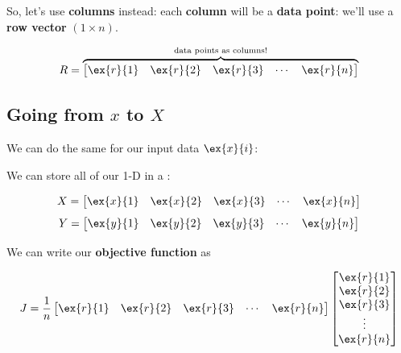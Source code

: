         So, let's use \textbf{columns} instead: each \textbf{column} will be a \textbf{data point}: we'll use a \textbf{row vector} $(1 \times n)$. 
        
        \begin{equation}
            R =
            \overbrace{
            \begin{bmatrix}
              \ex{r}{1} & \ex{r}{2} & \ex{r}{3} & \cdots & \ex{r}{n} 
            \end{bmatrix}
            }^{\text{data points as columns!}}
        \end{equation}
        
    \subsection{Going from $x$ to $X$}
    
        We can do the same for our input data $\ex{x}{i}$:\\
        
        \begin{notation}
            We can store all of our 1-D  in a :
            
            \begin{equation*}
                X =
                \begin{bmatrix}
                  \ex{x}{1} & \ex{x}{2} & \ex{x}{3} & \cdots & \ex{x}{n}
                \end{bmatrix}
            \end{equation*}
            \begin{equation*}
                Y =
                \begin{bmatrix}
                  \ex{y}{1} & \ex{y}{2} & \ex{y}{3} & \cdots & \ex{y}{n}
                \end{bmatrix}
            \end{equation*}
        \end{notation}
        
        We can write our \textbf{objective function} as
        
        \begin{equation}
            J = 
            \frac{1}{n}
            \begin{bmatrix}
              \ex{r}{1} & \ex{r}{2} & \ex{r}{3} & \cdots & \ex{r}{n}
            \end{bmatrix}
            \begin{bmatrix}
              \ex{r}{1} \\ \ex{r}{2} \\ \ex{r}{3} \\ \vdots \\ \ex{r}{n}
            \end{bmatrix}
        \end{equation}
        
